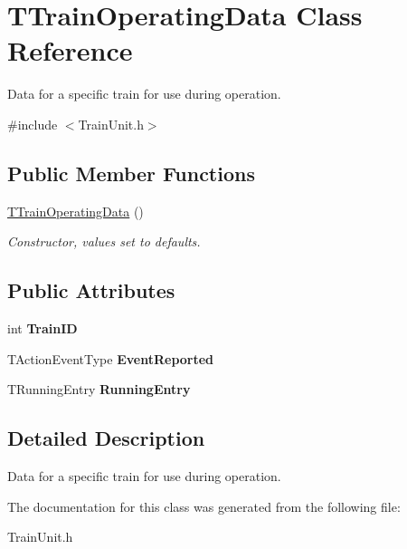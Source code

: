 \hypertarget{class_t_train_operating_data}{}\section{T\+Train\+Operating\+Data Class Reference}
\label{class_t_train_operating_data}


Data for a specific train for use during operation.  




{\ttfamily \#include $<$Train\+Unit.\+h$>$}

\subsection*{Public Member Functions}
\begin{DoxyCompactItemize}
\item 
\mbox{\label{class_t_train_operating_data_a0d7961667bbcdf20a744db7c1a2125af}} 
\mbox{\hyperlink{class_t_train_operating_data_a0d7961667bbcdf20a744db7c1a2125af}{T\+Train\+Operating\+Data}} ()
\begin{DoxyCompactList}\small\item\em Constructor, values set to defaults. \end{DoxyCompactList}\end{DoxyCompactItemize}
\subsection*{Public Attributes}
\begin{DoxyCompactItemize}
\item 
\mbox{\label{class_t_train_operating_data_aa75dba204a2655d41e74c42694e92b81}} 
int {\bfseries Train\+ID}
\item 
\mbox{\label{class_t_train_operating_data_afd7bc1b962e312062e0d27f0380e8c69}} 
T\+Action\+Event\+Type {\bfseries Event\+Reported}
\item 
\mbox{\label{class_t_train_operating_data_a9a46cddc0bed9cbbfff18b8909ae8047}} 
T\+Running\+Entry {\bfseries Running\+Entry}
\end{DoxyCompactItemize}


\subsection{Detailed Description}
Data for a specific train for use during operation. 

The documentation for this class was generated from the following file\+:\begin{DoxyCompactItemize}
\item 
Train\+Unit.\+h\end{DoxyCompactItemize}
